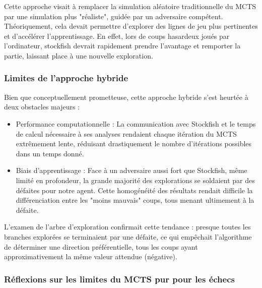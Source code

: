 \documentclass{article}
\begin{document}
    Cette approche visait à remplacer la simulation aléatoire traditionnelle du MCTS par une simulation plus "réaliste", guidée par un adversaire compétent. Théoriquement, cela devait permettre d'explorer des lignes de jeu plus pertinentes et d'accélérer l'apprentissage. En effet, lors de coups hasardeux joués par l’ordinateur, stockfish devrait rapidement prendre l’avantage et remporter la partie, laissant place à une nouvelle exploration.\\

    \subsubsection{Limites de l'approche hybride}

    \quad Bien que conceptuellement prometteuse, cette approche hybride s'est heurtée à deux obstacles majeurs :
    \begin{itemize} 
        \item Performance computationnelle : La communication avec Stockfish et le temps de calcul nécessaire à ses analyses rendaient chaque itération du MCTS extrêmement lente, réduisant drastiquement le nombre d'itérations possibles dans un temps donné.
        \item Biais d'apprentissage : Face à un adversaire aussi fort que Stockfish, même limité en profondeur, la grande majorité des explorations se soldaient par des défaites pour notre agent. Cette homogénéité des résultats rendait difficile la différenciation entre les "moins mauvais" coups, tous menant ultimement à la défaite.
    \end{itemize}
    
    L'examen de l'arbre d'exploration confirmait cette tendance : presque toutes les branches explorées se terminaient par une défaite, ce qui empêchait l'algorithme de déterminer une direction préférentielle, tous les coups ayant approximativement la même valeur attendue (négative).\\

    \subsubsection{Réflexions sur les limites du MCTS pur pour les échecs}
\end{document}
